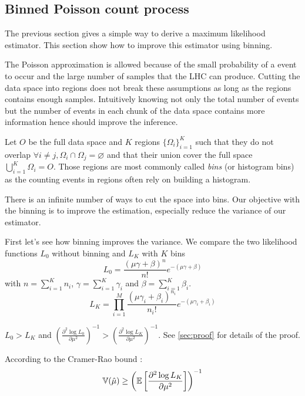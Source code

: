 \subsection{Binned Poisson count process} %
\label{sub:binned_poisson_count_process}

The previous section gives a simple way to derive a maximum likelihood estimator.
This section show how to improve this estimator using binning.

The Poisson approximation is allowed because of the small probability of a event to occur and the large number of samples that the LHC can produce.
Cutting the data space into regions does not break these assumptions as long as the regions contains enough samples.
Intuitively knowing not only the total number of events but the number of events in each chunk of the data space contains more information hence should improve the inference.

Let $O$ be the full data space and $K$ regions $\{\Omega_i\}_{i=1}^K$ such that they do not overlap $\forall i\neq j, \Omega_i \cap \Omega_j = \varnothing $ and that their union cover the full space $\bigcup_{i=1}^K \Omega_i = O$.
Those regions are most commonly called \emph{bins} (or histogram bins) as the counting events in regions often rely on building a histogram.

There is an infinite number of ways to cut the space into bins.
Our objective with the binning is to improve the estimation, especially reduce the variance of our estimator.

First let's see how binning improves the variance.
We compare the two likelihood functions $L_0$ without binning and $L_K$ with $K$ bins
\begin{equation}
    L_0 = \frac{(\mu \gamma + \beta)^n }{n!} e^{-(\mu \gamma + \beta)}
\end{equation}
with $n = \sum_{i=1}^K n_i $, $\gamma = \sum_{i=1}^K \gamma_i $ and $\beta = \sum_{i=1}^K \beta_i $.
\begin{equation}
    L_K = \prod_{i=1}^M \frac{(\mu \gamma_i + \beta_i)^{n_i} }{n_i!} e^{-(\mu \gamma_i + \beta_i)}
\end{equation}

$L_0 > L_K$ and 
$\left (\frac{\partial^2 \log L_0}{\partial \mu^2}\right )^{-1} > \left (\frac{\partial^2 \log L_K}{\partial \mu^2}\right )^{-1}$.
See \autoref{sec:proof} for details of the proof.

According to the Cramer-Rao bound :
\begin{equation}
    \mathbb{V}(\hat\mu) \geq \left (\mathbb{E} \left [ \frac{\partial^2 \log L_K}{\partial \mu^2}\right ] \right )^{-1}
\end{equation}


